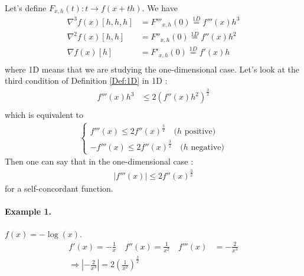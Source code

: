 Let's define $F_{x,h}(t) : t \rightarrow f(x+th)$. We have
\begin{align*}
\nabla^3 f(x)[h,h,h] & = F'''_{x,h}(0) \stackrel{1D}{=} f'''(x)h^3 \\
\nabla^2 f(x)[h,h] & = F''_{x,h}(0) \stackrel{1D}{=} f''(x)h^2\\
\nabla f(x)[h] & = F'_{x,h}(0) \stackrel{1D}{=} f'(x)h\\
\end{align*}
where 1D means that we are studying the one-dimensional case. Let's look at the third condition of Definition \ref{Def:1D} in 1D :
\begin{align*}
f'''(x)h^3 & \le 2 (f''(x)h^2)^\frac{3}{2} \\
\end{align*}
which is equivalent to
\begin{align*}
\left\{
\begin{aligned}
f'''(x) \le 2f''(x)^\frac{3}{2} \quad \text{($h$ positive)} \\
-f'''(x) \le 2f''(x)^\frac{3}{2} \quad \text{($h$ negative)}
\end{aligned}
\right.
\end{align*}
Then one can say that in the one-dimensional case :
\begin{align*}
|f'''(x)| \le 2f''(x)^\frac{3}{2}
\end{align*}
for a self-concordant function.
\paragraph{Example 1.} $f(x) = -\log{(x)}$. 
\begin{align*}
f'(x) = -\frac{1}{x} \quad f''(x) = \frac{1}{x^2} \quad f'''(x) & = -\frac{2}{x^3} \\
\Rightarrow \left|-\frac{2}{x^3}\right| = 2 \left(\frac{1}{x^2}\right)^\frac{3}{2}
\end{align*}

